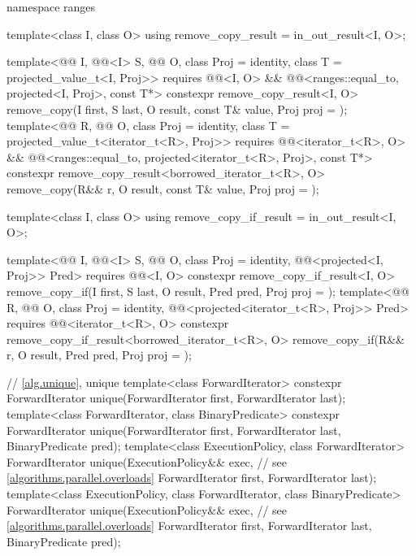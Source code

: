 \begin{codeblock}
{  namespace ranges {
    template<class I, class O>
      using remove_copy_result = in_out_result<I, O>;

    template<@@ I, @@<I> S, @@ O,
             class Proj = identity, class T = projected_value_t<I, Proj>>
      requires @@<I, O> &&
               @@<ranges::equal_to, projected<I, Proj>, const T*>
      constexpr remove_copy_result<I, O>
        remove_copy(I first, S last, O result, const T& value, Proj proj = {});
    template<@@ R, @@ O, class Proj = identity,
             class T = projected_value_t<iterator_t<R>, Proj>>
      requires @@<iterator_t<R>, O> &&
               @@<ranges::equal_to,
                                         projected<iterator_t<R>, Proj>, const T*>
      constexpr remove_copy_result<borrowed_iterator_t<R>, O>
        remove_copy(R&& r, O result, const T& value, Proj proj = {});

    template<class I, class O>
      using remove_copy_if_result = in_out_result<I, O>;

    template<@@ I, @@<I> S, @@ O,
             class Proj = identity, @@<projected<I, Proj>> Pred>
      requires @@<I, O>
      constexpr remove_copy_if_result<I, O>
        remove_copy_if(I first, S last, O result, Pred pred, Proj proj = {});
    template<@@ R, @@ O, class Proj = identity,
             @@<projected<iterator_t<R>, Proj>> Pred>
      requires @@<iterator_t<R>, O>
      constexpr remove_copy_if_result<borrowed_iterator_t<R>, O>
        remove_copy_if(R&& r, O result, Pred pred, Proj proj = {});
  }

  // \ref{alg.unique}, unique
  template<class ForwardIterator>
    constexpr ForwardIterator unique(ForwardIterator first, ForwardIterator last);
  template<class ForwardIterator, class BinaryPredicate>
    constexpr ForwardIterator unique(ForwardIterator first, ForwardIterator last,
                                     BinaryPredicate pred);
  template<class ExecutionPolicy, class ForwardIterator>
    ForwardIterator unique(ExecutionPolicy&& exec,              // see \ref{algorithms.parallel.overloads}
                           ForwardIterator first, ForwardIterator last);
  template<class ExecutionPolicy, class ForwardIterator, class BinaryPredicate>
    ForwardIterator unique(ExecutionPolicy&& exec,              // see \ref{algorithms.parallel.overloads}
                           ForwardIterator first, ForwardIterator last,
                           BinaryPredicate pred);

}
\end{codeblock}
